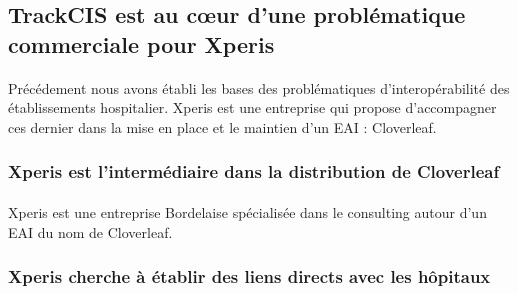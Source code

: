 	\subsection{TrackCIS est au cœur d'une problématique commerciale pour Xperis}
		\paragraph{}
		Précédement nous avons établi les bases des problématiques d'interopérabilité
		des établissements hospitalier. Xperis est une entreprise qui propose
		d'accompagner ces dernier dans la mise en place et le maintien d'un EAI :
		Cloverleaf.
		
		\subsubsection{Xperis est l'intermédiaire dans la distribution de Cloverleaf}
			\paragraph{}%
			Xperis est une entreprise Bordelaise spécialisée dans le
			consulting autour d'un EAI du nom de Cloverleaf.
			
			\paragraph{}%
			
			\paragraph{}%
			
			
		\subsubsection{Xperis cherche à établir des liens directs avec les hôpitaux}
			\paragraph{}%
			
			\paragraph{}%
			
			\paragraph{}%
			
